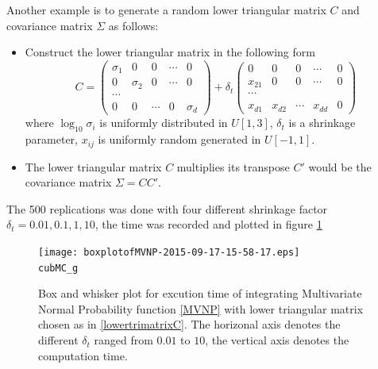 \documentclass{iitthesis}
\begin{document}
Another example is to generate a random lower triangular matrix $C$ and covariance matrix $\Sigma$ as follows:
\begin{itemize}
\item Construct the lower triangular matrix in the following form
\begin{equation}\label{lowertrimatrixC}
C = \left (\begin{array}{ccccc}
\sigma_1&0&0&\cdots&0\\
0&\sigma_2&0& \cdots &0 \\
\cdots\\
0&0&\cdots&0&\sigma_d \end{array}\right)+\delta_t  \left (\begin{array}{ccccc}
0&0&0&\cdots&0\\
x_{21}&0&0& \cdots &0 \\
\cdots\\
x_{d1}&x_{d2}&\cdots&x_{dd}&0 \end{array}\right)
\end{equation}
where $\log_{10}\sigma_i$ is uniformly distributed in $U[1,3]$, $\delta_t$ is a shrinkage parameter, $x_{ij}$ is uniformly random generated in $U[-1,1]$.
\item The lower triangular matrix $C$ multiplies its transpose $C'$ would be the covariance matrix $\Sigma = CC'$.
\end{itemize}
The 500 replications was done with four different shrinkage factor $\delta_t =  0.01,0.1, 1, 10$, the time was recorded and plotted in figure \ref{fig:MVNPadaptivitiy}
\begin{figure}
\centering
 \texttt{[image: boxplotofMVNP-2015-09-17-15-58-17.eps]} \\ {\tt cubMC\_g} 
\caption{Box and whisker plot for excution time of integrating Multivariate Normal Probability function \eqref{MVNP} with lower triangular matrix chosen as in \eqref{lowertrimatrixC}. The horizonal axis denotes the different $\delta_t$ ranged from $0.01$ to $10$, the vertical axis denotes the computation time. \label{fig:MVNPadaptivitiy} }
\end{figure}
\end{document}
